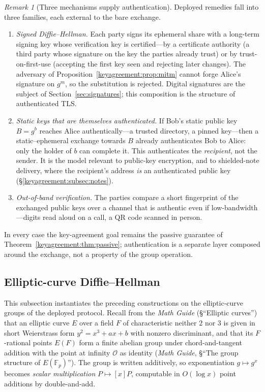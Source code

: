 \documentclass[11pt,a4paper]{article}
\theoremstyle{definition}
\theoremstyle{remark}
\newtheorem{remark}[theorem]{Remark}
\newcommand{\Fp}{\ensuremath{\mathbb{F}_{p}}}
\begin{document}
\begin{remark}[Three mechanisms supply authentication]
\label{keyagreement:rem:auth-supplied}
Deployed remedies fall into three families, each external to the bare
exchange.
\begin{enumerate}
\item \emph{Signed Diffie--Hellman.} Each party signs its ephemeral
  share with a long-term signing key whose verification key is
  certified---by a certificate authority (a third party whose
  signature on the key the parties already trust) or by
  trust-on-first-use (accepting the first key seen and rejecting
  later changes).
  The adversary of Proposition~\ref{keyagreement:prop:mitm} cannot
  forge Alice's signature on \(g^{m}\), so the substitution is
  rejected. Digital signatures are the subject of
  Section~\ref{sec:signatures}; this composition is the structure of
  authenticated TLS.
\item \emph{Static keys that are themselves authenticated.} If Bob's
  static public key \(B = g^{b}\) reaches Alice authentically---a
  trusted directory, a pinned key---then a static--ephemeral exchange
  towards \(B\) already authenticates Bob to Alice: only the holder of
  \(b\) can complete it. This authenticates the
  \emph{recipient}, not the sender. It is the model relevant to
  public-key encryption, and to shielded-note delivery, where the
  recipient's address \emph{is} an authenticated public key
  (\S\ref{keyagreement:subsec:notes}).
\item \emph{Out-of-band verification.} The parties compare a short
  fingerprint of the exchanged public keys over a channel that is
  authentic even if low-bandwidth---digits read aloud on a call, a QR
  code scanned in person.
\end{enumerate}
In every case the key-agreement goal remains the passive guarantee of
Theorem~\ref{keyagreement:thm:passive}; authentication is a separate
layer composed around the exchange, not a property of the group
operation.
\end{remark}

\subsection{Elliptic-curve Diffie--Hellman}
\label{keyagreement:subsec:ecdh}

This subsection instantiates the preceding constructions on the
elliptic-curve groups of the deployed protocol. Recall from the
\emph{Math Guide} (\S``Elliptic curves'') that an
elliptic curve \(E\) over a field \(F\) of characteristic neither
\(2\) nor \(3\) is given in short Weierstrass form
\(y^{2} = x^{3} + ax + b\) with nonzero discriminant, and that its
\(F\)-rational points \(E(F)\) form a finite abelian group under
chord-and-tangent addition with the point at infinity
\(\mathcal{O}\) as identity (\emph{Math Guide}, \S``The group
structure of \(E(\Fp)\)''). The group is written additively, so
exponentiation \(g \mapsto g^{x}\) becomes \emph{scalar
multiplication} \(P \mapsto [x]P\), computable in \(O(\log x)\) point
additions by double-and-add.
\end{document}
